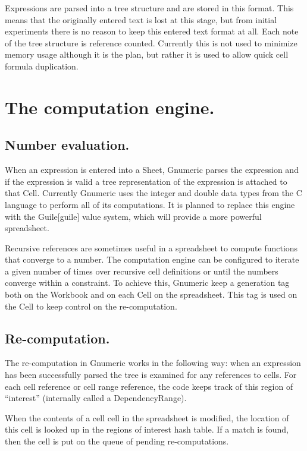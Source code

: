 \documentclass[12pt,twoside,twocolumn]{article}
\begin{document}
Expressions are parsed into a tree structure and are stored in this
format.  This means that the originally entered text is lost at this
stage, but from initial experiments there is no reason to keep this
entered text format at all.  Each note of the tree structure is
reference counted.  Currently this is not used to minimize memory
usage although it is the plan, but rather it is used to allow quick
cell formula duplication.



\section{The computation engine.}

\subsection{Number evaluation.}

When an expression is entered into a Sheet, Gnumeric parses the
expression and if the expression is valid a tree representation of the
expression is attached to that Cell.  Currently Gnumeric uses the
integer and double data types from the C language to perform all of
its computations.  It is planned to replace this engine with the
Guile[guile] value system, which will provide a more powerful
spreadsheet. 


Recursive references are sometimes useful in a spreadsheet to compute
functions that converge to a number.  The computation engine can be
configured to iterate a given number of times over recursive cell
definitions or until the numbers converge within a constraint.  To
achieve this, Gnumeric keep a generation tag both on the Workbook and
on each Cell on the spreadsheet.  This tag is used on the Cell to keep
control on the re-computation.

\subsection{Re-computation.}

The re-computation in Gnumeric works in the following way: when an
expression has been successfully parsed the tree is examined for any
references to cells.  For each cell reference or cell range reference,
the code keeps track of this region of ``interest'' (internally called
a DependencyRange).  

When the contents of a cell cell in the spreadsheet is modified, the
location of this cell is looked up in the regions of interest hash
table.  If a match is found, then the cell is put on the queue of
pending re-computations. 
\end{document}
